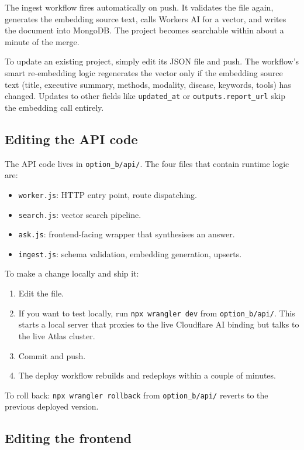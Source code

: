 \documentclass[11pt,a4paper]{article}
\begin{document}
The ingest workflow fires automatically on push. It validates the file again, generates the embedding source text, calls Workers AI for a vector, and writes the document into MongoDB. The project becomes searchable within about a minute of the merge.

To update an existing project, simply edit its JSON file and push. The workflow's smart re-embedding logic regenerates the vector only if the embedding source text (title, executive summary, methods, modality, disease, keywords, tools) has changed. Updates to other fields like \texttt{updated\_at} or \texttt{outputs.report\_url} skip the embedding call entirely.

\subsection{Editing the API code}

The API code lives in \texttt{option\_b/api/}. The four files that contain runtime logic are:

\begin{itemize}[leftmargin=1.5em,itemsep=2pt]
  \item \texttt{worker.js}: HTTP entry point, route dispatching.
  \item \texttt{search.js}: vector search pipeline.
  \item \texttt{ask.js}: frontend-facing wrapper that synthesises an answer.
  \item \texttt{ingest.js}: schema validation, embedding generation, upserts.
\end{itemize}

To make a change locally and ship it:

\begin{enumerate}[leftmargin=1.5em,itemsep=2pt]
  \item Edit the file.
  \item If you want to test locally, run \texttt{npx wrangler dev} from \texttt{option\_b/api/}. This starts a local server that proxies to the live Cloudflare AI binding but talks to the live Atlas cluster.
  \item Commit and push.
  \item The deploy workflow rebuilds and redeploys within a couple of minutes.
\end{enumerate}

To roll back: \texttt{npx wrangler rollback} from \texttt{option\_b/api/} reverts to the previous deployed version.

\subsection{Editing the frontend}
\end{document}
